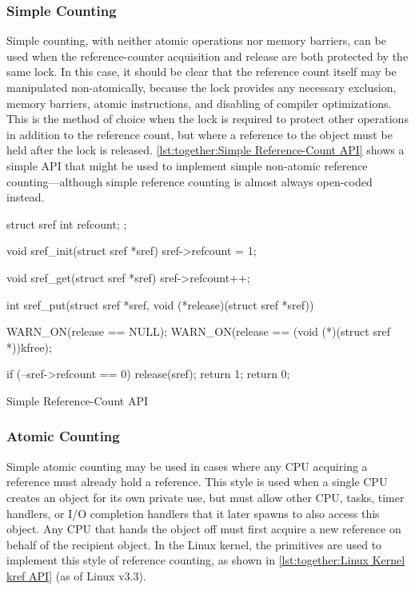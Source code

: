 \subsubsection{Simple Counting}
\label{sec:together:Simple Counting}

Simple counting, with neither atomic operations nor memory barriers,
can be used when the reference-counter acquisition and release are
both protected by the same lock.
In this case, it should be clear that the reference count itself
may be manipulated non-atomically, because the lock provides any
necessary exclusion, memory barriers, atomic instructions, and disabling
of compiler optimizations.
This is the method of choice when the lock is required to protect
other operations in addition to the reference count, but where
a reference to the object must be held after the lock is released.
\cref{lst:together:Simple Reference-Count API} shows a simple
API that might be used to implement simple non-atomic reference
counting---although simple reference counting is almost always
open-coded instead.

\begin{listing}[tbp]
\begin{linelabel}
\begin{VerbatimL}[commandchars=\\\[\]]
struct sref {
	int refcount;
};

void sref_init(struct sref *sref)
{
	sref->refcount = 1;
}

void sref_get(struct sref *sref)
{
	sref->refcount++;
}

int sref_put(struct sref *sref,
             void (*release)(struct sref *sref))
{
	WARN_ON(release == NULL);
	WARN_ON(release == (void (*)(struct sref *))kfree);

	if (--sref->refcount == 0) {
		release(sref);
		return 1;
	}
	return 0;
}
\end{VerbatimL}
\end{linelabel}
\caption{Simple Reference-Count API}
\label{lst:together:Simple Reference-Count API}
\end{listing}

\subsubsection{Atomic Counting}
\label{sec:together:Atomic Counting}

Simple atomic counting may be used in cases where any CPU acquiring
a reference must already hold a reference.
This style is used when a single CPU creates an object for its
own private use, but must allow other CPU, tasks, timer handlers,
or I/O completion handlers that it later spawns to also access this object.
Any CPU that hands the object off must first acquire a new reference
on behalf of the recipient object.
In the Linux kernel, the  primitives are used to implement
this style of reference counting, as shown in
\cref{lst:together:Linux Kernel kref API} (as of Linux v3.3).

